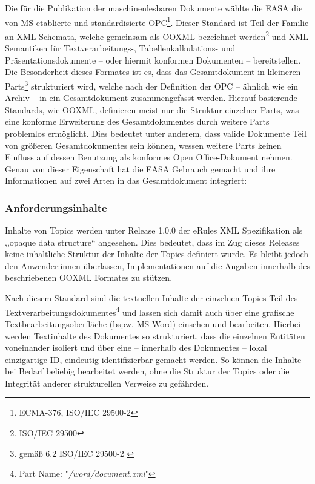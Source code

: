     Die für die Publikation der maschinenlesbaren Dokumente wählte die \ac{EASA} die von \acf{MS} etablierte und standardisierte \acf{OPC}\footnote{\acs{ECMA}-376, ISO/IEC 29500-2}.
    Dieser Standard ist Teil der Familie an \ac{XML} Schemata, welche gemeinsam als \acf{OOXML} bezeichnet werden\footnote{ ISO/IEC 29500} und \ac{XML} Semantiken für Textverarbeitungs-, Tabellen\-kal\-ku\-lations- und Präsentationsdokumente -- oder hiermit konformen Dokumenten -- bereitstellen. 
    \cite[vii]{easa_opc_iso} 
    Die Besonderheit dieses Formates ist es, dass das Gesamtdokument in kleineren Parts\footnote{gemäß 6.2 ISO/IEC 29500-2 \cite{easa_opc_iso}} strukturiert wird, welche nach der Definition der \ac{OPC} -- ähnlich wie ein Archiv -- in ein Gesamtdokument zusammengefasst werden.
    Hierauf basierende Standards, wie \ac{OOXML}, definieren meist nur die Struktur einzelner Parts, was eine konforme Erweiterung des Gesamtdokumentes durch weitere Parts problemlos ermöglicht.   
    Dies bedeutet unter anderem, dass valide Dokumente Teil von größeren Gesamtdokumentes sein können, wessen weitere Parts keinen Einfluss auf dessen Benutzung als konformes Open Office-Dokument nehmen.
    Genau von dieser Eigenschaft hat die \ac{EASA} Gebrauch gemacht und ihre Informationen auf zwei Arten in das Gesamtdokument integriert:

    \pagebreak
            \subsubsection{Anforderungsinhalte}

    Inhalte von Topics werden unter Release 1.0.0 der eRules \ac{XML} Spezifikation als ,,opaque data structure`` angesehen.
    Dies bedeutet, dass im Zug dieses Releases keine inhaltliche Struktur der Inhalte der Topics definiert wurde.
    Es bleibt jedoch den Anwender:innen überlassen, Implementationen auf die Angaben innerhalb des beschriebenen \acs{OOXML} Formates zu stützen.
    \cite[6]{easa_xml_doc}

    Nach diesem Standard sind die textuellen Inhalte der einzelnen Topics Teil des Textverarbeitungsdokumentes\footnote{Part Name: "\textit{/word/document.xml}"} und lassen sich damit auch über eine grafische Textbearbeitungsoberfläche (bspw. \ac{MS} Word) einsehen und bearbeiten.
    Hierbei werden Textinhalte des Dokumentes so strukturiert, dass die einzelnen Entitäten voneinander isoliert und über eine -- innerhalb des Dokumentes -- lokal einzigartige ID, eindeutig identifizierbar gemacht werden.
    So können die Inhalte bei Bedarf beliebig bearbeitet werden, ohne die Struktur der Topics oder die Integrität anderer strukturellen Verweise zu gefährden.

